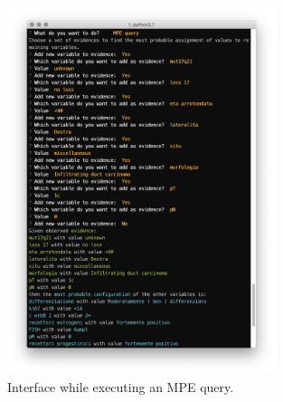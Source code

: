 \begin{figure}[htbp]
\centerline{\includegraphics[width=0.7\textwidth]{methodology/images/nl-mpe-query}}
\caption{Interface while executing an MPE query.}
\label{fig:nl-mpe}
\end{figure}




